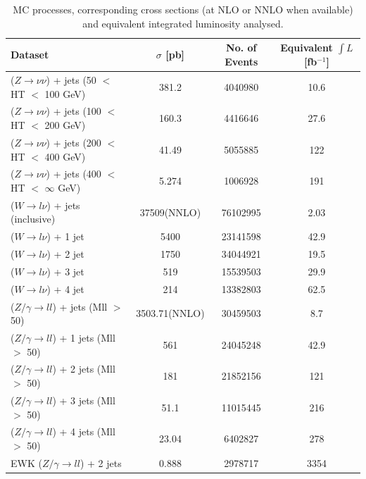 \begin{longtable}{| l | c | c | c |}
  \caption{\label{tab:MCSamples} MC processes, corresponding cross sections (at NLO or NNLO when available) and equivalent integrated
    luminosity analysed.} \\
  \hline 
  Dataset & $\sigma$ [pb] & No. of Events & Equivalent $\int L$ [fb$^{-1}$] \\
  \hline 
  ($Z \rightarrow \nu\nu$) + jets (50 $<$ HT $<$ 100 GeV)       & 381.2         &  4040980 &    10.6 \\
  ($Z \rightarrow \nu\nu$) + jets (100 $<$ HT $<$ 200 GeV)      & 160.3         &  4416646 &    27.6 \\
  ($Z \rightarrow \nu\nu$) + jets (200 $<$ HT $<$ 400 GeV)      & 41.49         &  5055885 &     122 \\
  ($Z \rightarrow \nu\nu$) + jets (400 $<$ HT $<$ $\infty$ GeV) & 5.274         &  1006928 &     191 \\
  ($W \rightarrow l\nu$) + jets (inclusive)                     & 37509(NNLO)   & 76102995 &    2.03 \\
  ($W \rightarrow l\nu$) + 1 jet                                & 5400          & 23141598 &    42.9 \\
  ($W \rightarrow l\nu$) + 2 jet                                & 1750          & 34044921 &    19.5 \\
  ($W \rightarrow l\nu$) + 3 jet                                & 519           & 15539503 &    29.9 \\
  ($W \rightarrow l\nu$) + 4 jet                                & 214           & 13382803 &    62.5 \\
  ($Z/\gamma \rightarrow ll$) + jets (Mll $>$ 50)               & 3503.71(NNLO) & 30459503 &     8.7 \\
  ($Z/\gamma \rightarrow ll$) + 1 jets (Mll $>$ 50)             & 561           & 24045248 &    42.9 \\
  ($Z/\gamma \rightarrow ll$) + 2 jets (Mll $>$ 50)             & 181           & 21852156 &     121 \\
  ($Z/\gamma \rightarrow ll$) + 3 jets (Mll $>$ 50)             & 51.1          & 11015445 &     216 \\
  ($Z/\gamma \rightarrow ll$) + 4 jets (Mll $>$ 50)             & 23.04         &  6402827 &     278 \\
  EWK ($Z/\gamma \rightarrow ll$) + 2 jets                      & 0.888         &  2978717 &    3354 \\

\end{longtable}
